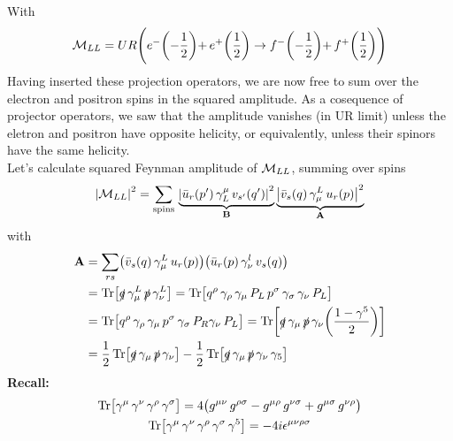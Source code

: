 \documentclass[TheoreticalPhy_ModB.tex]{subfiles}
\begin{document}
\begin{center}

\end{center}
With 
\[
\mathcal{M}_{LL} = UR \Biggl( e^- \biggl( -\frac{1}{2} \biggl) + \, e^+ \biggl( \frac{1}{2} \biggr) \to f^- \biggl( -\frac{1}{2} \biggl) + \, f^+ \biggl( \frac{1}{2} \biggr) \Biggr)
\]
Having inserted these projection operators, we are now free to sum over the electron and positron spins in the squared amplitude. As a cosequence of projector operators, we saw that the amplitude vanishes (in UR limit) unless the eletron and positron have opposite helicity, or equivalently, unless their spinors have the same helicity.\\
Let's calculate squared Feynman amplitude of $\mathcal{M}_{LL}$, summing over spins
\[
\abs{\mathcal{M}_{LL}}^2 = \sum_{\text{spins}} \,
	\underbrace{\abs{ \bar{u}_r(p') \, \gamma^{\mu}_L \, v_{s'}(q') }^2}_{\textbf{B}}
	\underbrace{\abs{ \bar{v}_s(q) \, \gamma^L_{\mu} \, u_r(p) }^2}_{\textbf{A}}
\]
with
\[
\begin{split}
\textbf{A}	& = \sum_{r s} \bigl( \bar{v}_s(q) \, \gamma^L_{\mu} \, u_r(p) \bigr) \bigl(	\bar{u}_r(p) \, \gamma^l_{\nu} \, v_s(q) \bigr) \\
		& = \Tr \bigl[ \slashed q \, \gamma_{\mu}^L \, \slashed p \, \gamma_{\nu}^L \bigr]
			= \Tr \bigl[ q^{\rho} \, \gamma_{\rho} \, \gamma_{\mu} \, P_L \, p^{\sigma} \, \gamma_{\sigma} \, \gamma_{\nu} \, P_L \bigr] \\
		& = \Tr \bigl[ q^{\rho} \, \gamma_{\rho} \, \gamma_{\mu} \, p^{\sigma} \, \gamma_{\sigma} \, P_R \gamma_{\nu} \, P_L \bigr]
			= \Tr \biggl[ \slashed q \, \gamma_{\mu} \, \slashed p \, \gamma_{\nu} \biggl( \frac{1-\gamma^5}{2} \biggr) \biggr] \\
		& = \frac{1}{2} \Tr \bigl[ \slashed q \, \gamma_{\mu} \, \slashed p \, \gamma_{\nu} \bigr]
			- \frac{1}{2} \Tr \bigl[ \slashed q \, \gamma_{\mu} \, \slashed p \, \gamma_{\nu} \, \gamma_5 \bigr]
\end{split}
\]
\textbf{Recall:}
\begin{gather*}
\Tr \bigl[ \gamma^{\mu} \, \gamma^{\nu} \, \gamma^{\rho} \, \gamma^{\sigma} \bigr] 
	= 4 \bigl( g^{\mu\nu} \, g^{\rho\sigma} - g^{\mu\rho} \, g^{\nu\sigma} + g^{\mu\sigma} \, g^{\nu\rho} \bigr) \\
\Tr \bigl[ \gamma^{\mu} \, \gamma^{\nu} \, \gamma^{\rho} \, \gamma^{\sigma} \, \gamma^5 \bigr] = -4i\epsilon^{\mu\nu\rho\sigma} 
\end{gather*}
\end{document}
